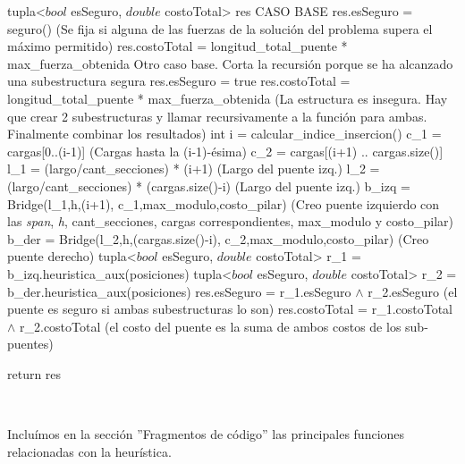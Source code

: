 \begin{algorithmic}
	\State tupla<$bool$ esSeguro, $double$ costoTotal> res
	\State CASO BASE
		\State res.esSeguro = seguro() (Se fija si alguna de las fuerzas 
		\State de la solución del problema supera el máximo permitido)
		\State res.costoTotal = longitud\_total\_puente * max\_fuerza\_obtenida
	\Else
		\State Otro caso base. Corta la recursión porque se ha alcanzado una subestructura segura
			\State res.esSeguro = true
			\State res.costoTotal = longitud\_total\_puente * max\_fuerza\_obtenida
		\Else
			\State (La estructura es insegura. Hay que crear 2 subestructuras
			\State y llamar recursivamente a la función para ambas.
			\State Finalmente combinar los resultados)
			\State int i = calcular\_indice\_insercion()
			\State c\_1 = cargas[0..(i-1)] (Cargas hasta la (i-1)-ésima)
			\State c\_2 = cargas[(i+1) .. cargas.size()]
			\State l\_1 = (largo/cant\_secciones) * (i+1) (Largo del puente izq.)
			\State l\_2 = (largo/cant\_secciones) * (cargas.size()-i) (Largo del puente izq.)
			\State b\_izq = Bridge(l\_1,h,(i+1), c\_1,max\_modulo,costo\_pilar)
			\State (Creo puente izquierdo con las \emph{span}, \emph{h}, 
			\State cant\_secciones, cargas correspondientes, max\_modulo y costo\_pilar)
			\State b\_der = Bridge(l\_2,h,(cargas.size()-i), c\_2,max\_modulo,costo\_pilar)
			\State (Creo puente derecho)
			\State tupla<$bool$ esSeguro, $double$ costoTotal> r\_1 = b\_izq.heuristica\_aux(posiciones)
			\State tupla<$bool$ esSeguro, $double$ costoTotal> r\_2 = b\_der.heuristica\_aux(posiciones)
			\State res.esSeguro = r\_1.esSeguro $\wedge$ r\_2.esSeguro
			\State (el puente es seguro si ambas subestructuras lo son)
			\State res.costoTotal = r\_1.costoTotal $\wedge$ r\_2.costoTotal
			\State (el costo del puente es la suma de ambos costos de los sub-puentes)
		\EndIf	

	\EndIf
	\State return res
\EndFunction
\end{algorithmic}

~

Incluímos en la sección ''Fragmentos de código'' las principales funciones relacionadas con la heurística.

